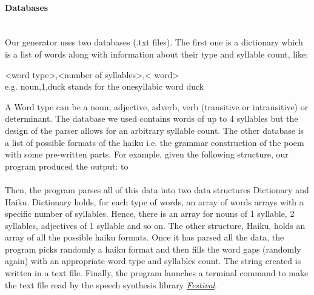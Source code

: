 \documentclass[10pt]{article}
\begin{document}
\paragraph{Databases}\mbox{}\\
Our generator uses two databases (.txt files). The first one is a dictionary which is a list of words along with information about their type and syllable count, like:
\begin{center}
\textless word type\textgreater,\textless number of syllables\textgreater,\textless
word\textgreater
\mbox{}\\
e.g. noun,1,duck stands for the onesyllabic word duck
\end{center}
A Word type can be a noun, adjective, adverb, verb (transitive or intransitive) or determinant. The database we used contains words of up to 4 syllables but the design of the parser allows for an arbitrary syllable count.\newline
The other database is a list of possible formats of the haiku i.e. the grammar construction of the poem with some pre-written parts. For example, given the following structure, our program produced the output:\newline\newline
\leavevmode\hbox to 
\mbox{}\\
\mbox{}\\
Then, the program parses all of this data into two data structures Dictionary and Haiku. Dictionary holds, for each type of words, an array of words arrays with a specific number of syllables. Hence, there is an array for nouns of 1 syllable, 2 syllables, adjectives of 1 syllable and so on.
The other structure, Haiku, holds an array of all the possible haiku formats.
Once it has parsed all the data, the program picks randomly a haiku format and then fills the word gaps (randomly again) with an appropriate word type and syllables count. The string created is written in a text file.\newline 
Finally, the program launches a terminal command to make the text file read by the speech synthesis library \href{http://www.cstr.ed.ac.uk/projects/festival/}{\textit{Festival}}.
\end{document}
